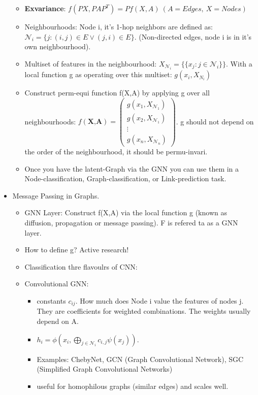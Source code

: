 \begin{itemize}[noitemsep,nolistsep]
\begin{itemize}[noitemsep,nolistsep]
		\item \textbf{Exvariance}: $f(PX,PAP^T) = Pf(X,A)\ (A = Edges,\ X = Nodes)$
		\item Neighbourhoods: Node i, it's 1-hop neighbors are defined as: $\mathcal{N}_i = \{j: (i,j) \in E \vee (j,i) \in E\}$. (Non-directed edges, node i is in it's own neighbourhood).
		\item Multiset of features in the neighbourhood: $X_{\mathcal{N}_i} = \{\{ x_j : j \in \mathcal{N}_i \}\}$. With a local function g as operating over this multiset: $g(x_i, X_{N_i})$
		\item Construct perm-equi function f(X,A) by applying g over all neighbourhoods: $f(\textbf{X,A}) = \begin{pmatrix} g(x_1,X_{\mathcal{N}_1}) \\ g(x_2,X_{\mathcal{N}_1}) \\ \vdots \\ g(x_n,X_{\mathcal{N}_n}) \end{pmatrix}$. g should not depend on the order of the neighbourhood, it should be permu-invari.
		\item Once you have the latent-Graph via the GNN you can use them in a Node-classification,  Graph-classification, or Link-prediction task.
	\end{itemize}
	\item Message Passing in Graphs.
	\begin{itemize}[noitemsep,nolistsep]
		\item GNN Layer: Construct f(X,A) via the local function g (known as diffusion, propagation or message passing). F is refered ta as a GNN layer.
		\item How to define g? Active research!
		\item Classification thre flavoulrs of CNN:
		\item Convolutional GNN:
		\begin{itemize}[noitemsep,nolistsep]
			\item constants $c_{ij}$. How much does Node i value the features of nodes j. They are coefficients for weighted combinations. The weights usually depend on A.
			\item $h_i = \phi (x_i, \bigoplus_{j \in \mathcal{N}_i} c_{i,j}\psi(x_j))$. 
			\item Examples: ChebyNet, GCN (Graph Convolutional Network), SGC (Simplified Graph Convolutional Networks)
			\item useful for homophilous graphs (similar edges) and scales well.
		\end{itemize}

\end{itemize}
\end{itemize}
